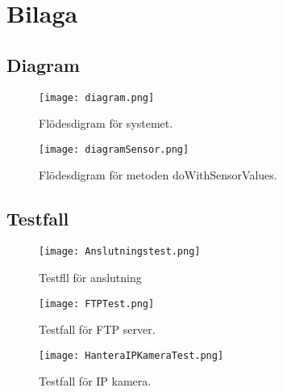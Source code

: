
\chapter{Bilaga} %
\label{bilaga}

\ifpdf
    \graphicspath{{10_bilaga/figures/PNG/}{10/figures/PDF/}{10/figures/}}
\else
    \graphicspath{{10_bilaga/figures/EPS/}{10/figures/}}
\fi

\graphicspath{{10_bilaga/figures/}{10/figures/}}


\section{Diagram}

\begin{figure}[h]
  \texttt{[image: diagram.png]}
  \caption{Flödesdigram för systemet.}
  \label{fig:diagram}
\end{figure}

\begin{figure}[h]
  \texttt{[image: diagramSensor.png]}
  \caption{Flödesdigram för metoden doWithSensorValues.}
  \label{fig:diagramSensor}
\end{figure}

\section{Testfall}

\begin{figure}[h]
  \texttt{[image: Anslutningstest.png]}
  \caption{Testfll för anslutning}
  \label{fig:Anslutningstest}
\end{figure}

\begin{figure}[h]
  \texttt{[image: FTPTest.png]}
  \caption{Testfall för FTP server.}
  \label{fig:FTPTest}
\end{figure}

\begin{figure}[h]
  \texttt{[image: HanteraIPKameraTest.png]}
  \caption{Testfall för IP kamera.}
  \label{fig:HanteraIPKameraTest}
\end{figure}

